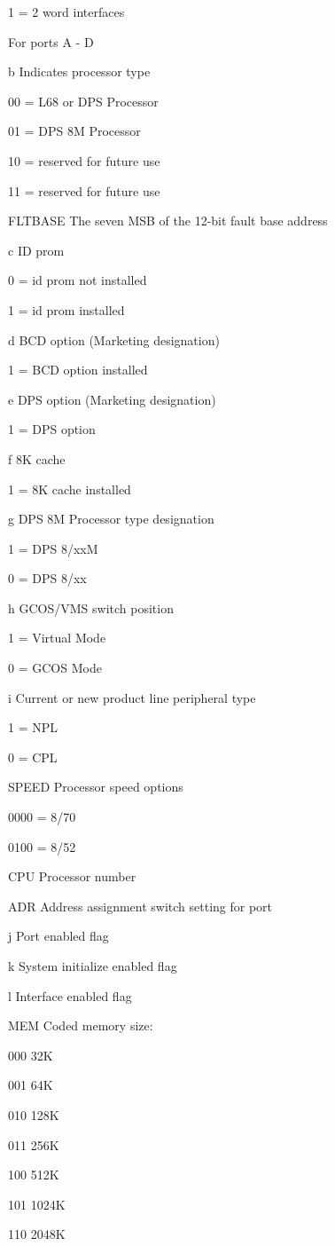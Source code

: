 1 = 2 word interfaces

For ports A - D

b Indicates processor type

00 = L68 or DPS Processor

01 = DPS 8M Processor

10 = reserved for future use

11 = reserved for future use

FLTBASE The seven MSB of the 12-bit fault base address

c ID prom

0 = id prom not installed

1 = id prom installed

d BCD option (Marketing designation)

1 = BCD option installed

e DPS option (Marketing designation)

1 = DPS option

f 8K cache

1 = 8K cache installed

g DPS 8M Processor type designation

1 = DPS 8/xxM

0 = DPS 8/xx

h GCOS/VMS switch position

1 = Virtual Mode

0 = GCOS Mode

i Current or new product line peripheral type

1 = NPL

0 = CPL

SPEED Processor speed options

0000 = 8/70

0100 = 8/52

CPU Processor number

ADR Address assignment switch setting for port

j Port enabled flag

k System initialize enabled flag

l Interface enabled flag

MEM Coded memory size:

000 32K

001 64K

010 128K

011 256K

100 512K

101 1024K

110 2048K

